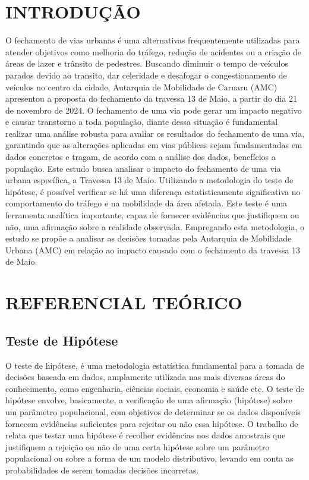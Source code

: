 \section{INTRODUÇÃO}
O fechamento de vias urbanas é uma alternativas frequentemente utilizadas para atender objetivos como melhoria do tráfego, redução de acidentes ou a criação de áreas de lazer e trânsito de pedestres. Buscando diminuir o tempo de veículos parados devido ao transito, dar celeridade e desafogar o congestionamento de veículos no centro da cidade, Autarquia de Mobilidade de Caruaru (AMC) apresentou a proposta do fechamento da travessa 13 de Maio, a partir do dia 21 de novembro de 2024. O fechamento de uma via pode gerar um impacto negativo e causar transtorno a toda população, diante dessa situação é fundamental realizar uma análise robusta para avaliar os resultados do fechamento de uma via, garantindo que as alterações aplicadas em vias públicas sejam fundamentadas em dados concretos e tragam, de acordo com a análise dos dados, benefícios a população. 
Este estudo busca analisar o impacto do fechamento de uma via urbana específica, a Travessa 13 de Maio. Utilizando a metodologia do teste de hipótese, é possível verificar se há uma diferença estatisticamente significativa no comportamento do tráfego e na mobilidade da área afetada. Este teste é uma ferramenta analítica importante, capaz de fornecer evidências que justifiquem ou não, uma afirmação sobre a realidade observada. Empregando esta metodologia, o estudo se propõe a analisar as decisões tomadas pela Autarquia de Mobilidade Urbana (AMC) em relação ao impacto causado com o fechamento da travessa 13 de Maio.
\section{REFERENCIAL TEÓRICO}

\subsection{Teste de Hipótese}
O teste de hipótese, é uma metodologia estatística fundamental para a tomada de decisões baseada em dados, amplamente utilizada nas mais diversas áreas do conhecimento, como engenharia, ciências sociais, economia e saúde etc. O teste de hipótese envolve, basicamente, a verificação de uma afirmação (hipótese) sobre um parâmetro populacional, com objetivos de determinar se os dados disponíveis fornecem evidências suficientes para rejeitar ou não essa hipótese. O trabalho de  \citealp{naghettini2007hidrologia} relata que testar uma hipótese é recolher evidências nos dados amostrais que justifiquem a rejeição ou não de uma certa hipótese sobre um parâmetro populacional ou sobre a forma de um modelo  distributivo, levando em conta as probabilidades de serem tomadas decisões incorretas. 


